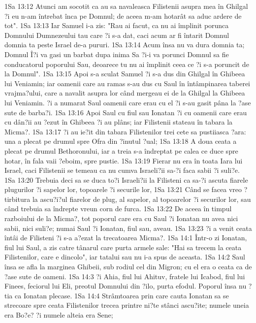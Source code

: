 1Sa 13:12  Atunci am socotit ca au sa navaleasca Filistenii asupra mea în Ghilgal ?i eu n-am întrebat înca pe Domnul; de aceea m-am hotarât sa aduc ardere de tot".
1Sa 13:13  Iar Samuel i-a zis: "Rau ai facut, ca nu ai împlinit porunca Domnului Dumnezeului tau care ?i s-a dat, caci acum ar fi întarit Domnul domnia ta peste Israel de-a pururi.
1Sa 13:14  Acum însa nu va dura domnia ta; Domnul Î?i va gasi un barbat dupa inima Sa ?i-i va porunci Domnul sa fie conducatorul poporului Sau, deoarece tu nu ai împlinit ceea ce ?i s-a poruncit de la Domnul".
1Sa 13:15  Apoi s-a sculat Samuel ?i s-a dus din Ghilgal în Ghibeea lui Veniamin; iar oamenii care au ramas s-au dus cu Saul în întâmpinarea taberei vrajma?ului, care a navalit asupra lor când mergeau ei de la Ghilgal la Ghibeea lui Veniamin. ?i a numarat Saul oamenii care erau cu el ?i s-au gasit pâna la ?ase sute de barba?i.
1Sa 13:16  Apoi Saul cu fiul sau Ionatan ?i cu oamenii care erau cu dân?ii au ?ezut în Ghibeea ?i au plâns; iar Filistenii stateau în tabara la Micma?.
1Sa 13:17  ?i au ie?it din tabara Filistenilor trei cete sa pustiiasca ?ara: una a plecat pe drumul spre Ofra din ?inutul ?ual;
1Sa 13:18  A doua ceata a plecat pe drumul Bethoronului, iar a treia s-a îndreptat pe calea ce duce spre hotar, în fala vaii ?eboim, spre pustie.
1Sa 13:19  Fierar nu era în toata Iara lui Israel, caci Filistenii se temeau ca nu cumva Israeli?ii sa-?i faca sabii ?i suli?e.
1Sa 13:20  Trebuia deci sa se duca to?i Israeli?ii la Filisteni ca sa-?i ascuta fiarele plugurilor ?i sapelor lor, topoarele ?i securile lor,
1Sa 13:21  Când se facea vreo ?tirbitura la ascu?i?ul fiarelor de plug, al sapelor, al topoarelor ?i securilor lor, sau când trebuia sa îndrepte vreun corn de furca.
1Sa 13:22  De aceea în timpul razboiului de la Micma?, tot poporul care era cu Saul ?i Ionatan nu avea nici sabii, nici suli?e; numai Saul ?i Ionatan, fiul sau, aveau.
1Sa 13:23  ?i a venit ceata întâi de Filisteni ?i s-a a?ezat la trecatoarea Micma?.
1Sa 14:1  Într-o zi Ionatan, fiul lui Saul, a zis catre tânarul care purta armele sale: "Hai sa trecem la ceata Filistenilor, care e dincolo", iar tatalui sau nu i-a spus de aceasta.
1Sa 14:2  Saul însa se afla la marginea Ghibeii, sub rodiul cel din Migron; cu el era o ceata ca de ?ase sute de oameni.
1Sa 14:3  ?i Ahia, fiul lui Ahituv, fratele lui Icabod, fiul lui Finees, feciorul lui Eli, preotul Domnului din ?ilo, purta efodul. Poporul însa nu ?tia ca Ionatan plecase.
1Sa 14:4  Strâmtoarea prin care cauta Ionatan sa se strecoare spre ceata Filistenilor trecea printre ni?te stânci ascu?ite; numele uneia era Bo?e? ?i numele alteia era Sene;
